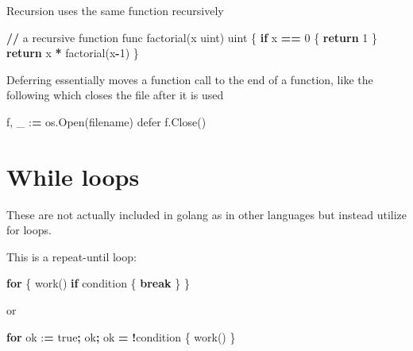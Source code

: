 \documentclass[]{book}
\newenvironment{Shaded}{\begin{snugshade}}{\end{snugshade}}
\newcommand{\DecValTok}[1]{\textcolor[rgb]{0.00,0.00,0.81}{#1}}
\newcommand{\ControlFlowTok}[1]{\textcolor[rgb]{0.13,0.29,0.53}{\textbf{#1}}}
\newcommand{\OperatorTok}[1]{\textcolor[rgb]{0.81,0.36,0.00}{\textbf{#1}}}
\newcommand{\NormalTok}[1]{#1}
\begin{document}
Recursion uses the same function recursively

\begin{Shaded}
\begin{Highlighting}[]
\OperatorTok{//}\NormalTok{ a recursive function      }
\NormalTok{func factorial(x uint) uint \{}
    \ControlFlowTok{if}\NormalTok{ x }\OperatorTok{==} \DecValTok{0}\NormalTok{ \{              }
        \ControlFlowTok{return} \DecValTok{1}             
\NormalTok{    \}                        }
    \ControlFlowTok{return}\NormalTok{ x }\OperatorTok{*}\NormalTok{ factorial(x}\OperatorTok{-}\DecValTok{1}\NormalTok{)}
\NormalTok{\}      }
\end{Highlighting}
\end{Shaded}

Deferring essentially moves a function call to the end of a function,
like the following which closes the file after it is used

\begin{Shaded}
\begin{Highlighting}[]
\NormalTok{f, _ :}\OperatorTok{=}\NormalTok{ os.Open(filename)}
\NormalTok{defer f.Close()}
\end{Highlighting}
\end{Shaded}

\section{While loops}\label{while-loops}

These are not actually included in golang as in other languages but
instead utilize for loops.

This is a repeat-until loop:

\begin{Shaded}
\begin{Highlighting}[]
\ControlFlowTok{for}\NormalTok{ \{}
\NormalTok{    work()}
    \ControlFlowTok{if}\NormalTok{ condition \{}
        \ControlFlowTok{break}
\NormalTok{    \}}
\NormalTok{\}}
\end{Highlighting}
\end{Shaded}

or

\begin{Shaded}
\begin{Highlighting}[]
\ControlFlowTok{for}\NormalTok{ ok :}\OperatorTok{=}\NormalTok{ true}\OperatorTok{;}\NormalTok{ ok}\OperatorTok{;}\NormalTok{ ok }\OperatorTok{=} \OperatorTok{!}\NormalTok{condition \{}
\NormalTok{    work()}
\NormalTok{\}}
\end{Highlighting}
\end{Shaded}
\end{document}
